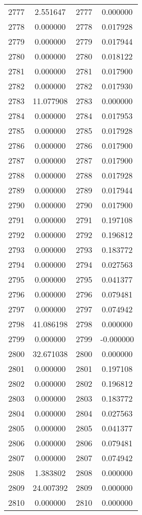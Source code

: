 \documentclass[12pt]{article}
\begin{document}
\begin{longtable}{@{}cccc@{}}
2777 & 2.551647 & 2777 & 0.000000 \\
2778 & 0.000000 & 2778 & 0.017928 \\
2779 & 0.000000 & 2779 & 0.017944 \\
2780 & 0.000000 & 2780 & 0.018122 \\
2781 & 0.000000 & 2781 & 0.017900 \\
2782 & 0.000000 & 2782 & 0.017930 \\
2783 & 11.077908 & 2783 & 0.000000 \\
2784 & 0.000000 & 2784 & 0.017953 \\
2785 & 0.000000 & 2785 & 0.017928 \\
2786 & 0.000000 & 2786 & 0.017900 \\
2787 & 0.000000 & 2787 & 0.017900 \\
2788 & 0.000000 & 2788 & 0.017928 \\
2789 & 0.000000 & 2789 & 0.017944 \\
2790 & 0.000000 & 2790 & 0.017900 \\
2791 & 0.000000 & 2791 & 0.197108 \\
2792 & 0.000000 & 2792 & 0.196812 \\
2793 & 0.000000 & 2793 & 0.183772 \\
2794 & 0.000000 & 2794 & 0.027563 \\
2795 & 0.000000 & 2795 & 0.041377 \\
2796 & 0.000000 & 2796 & 0.079481 \\
2797 & 0.000000 & 2797 & 0.074942 \\
2798 & 41.086198 & 2798 & 0.000000 \\
2799 & 0.000000 & 2799 & -0.000000 \\
2800 & 32.671038 & 2800 & 0.000000 \\
2801 & 0.000000 & 2801 & 0.197108 \\
2802 & 0.000000 & 2802 & 0.196812 \\
2803 & 0.000000 & 2803 & 0.183772 \\
2804 & 0.000000 & 2804 & 0.027563 \\
2805 & 0.000000 & 2805 & 0.041377 \\
2806 & 0.000000 & 2806 & 0.079481 \\
2807 & 0.000000 & 2807 & 0.074942 \\
2808 & 1.383802 & 2808 & 0.000000 \\
2809 & 24.007392 & 2809 & 0.000000 \\
2810 & 0.000000 & 2810 & 0.000000 \\

\end{longtable}
\end{document}
